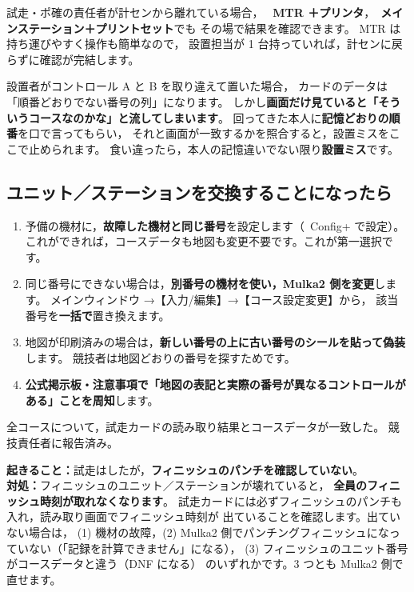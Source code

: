 \begin{Note}
試走・ポ確の責任者が計センから離れている場合，
\tEMIT\ \textbf{MTR ＋プリンタ}，\tSI\ \textbf{メインステーション＋プリントセット}でも
その場で結果を確認できます。
MTR は持ち運びやすく操作も簡単なので，
設置担当が 1 台持っていれば，計センに戻らずに確認が完結します。
\end{Note}

\begin{Note}
設置者がコントロール A と B を取り違えて置いた場合，
カードのデータは「順番どおりでない番号の列」になります。
しかし\textbf{画面だけ見ていると「そういうコースなのかな」と流してしまいます}。
回ってきた本人に\textbf{記憶どおりの順番}を口で言ってもらい，
それと画面が一致するかを照合すると，設置ミスをここで止められます。
食い違ったら，本人の記憶違いでない限り\textbf{設置ミス}です。
\end{Note}

\subsection*{ユニット／ステーションを交換することになったら}

\begin{enumerate}
\item 予備の機材に，\textbf{故障した機材と同じ番号}を設定します（\tSI\ Config+ で設定）。
      これができれば，コースデータも地図も変更不要です。これが第一選択です。
\item 同じ番号にできない場合は，\textbf{別番号の機材を使い，Mulka2 側を変更}します。
      メインウィンドウ →【入力/編集】→【コース設定変更】から，
      該当番号を\textbf{一括で}置き換えます。
\item 地図が印刷済みの場合は，\textbf{新しい番号の上に古い番号のシールを貼って偽装}します。
      競技者は地図どおりの番号を探すためです。
\item \textbf{公式掲示板・注意事項で「地図の表記と実際の番号が異なるコントロールがある」ことを周知}します。
\end{enumerate}

\begin{Done}
全コースについて，試走カードの読み取り結果とコースデータが一致した。
競技責任者に報告済み。
\end{Done}

\begin{Fail}
\textbf{起きること：}試走はしたが，\textbf{フィニッシュのパンチを確認していない}。\\
\textbf{対処：}フィニッシュのユニット／ステーションが壊れていると，
\textbf{全員のフィニッシュ時刻が取れなくなります}。
試走カードには必ずフィニッシュのパンチも入れ，読み取り画面でフィニッシュ時刻が
出ていることを確認します。出ていない場合は，
(1) 機材の故障，(2) Mulka2 側でパンチングフィニッシュになっていない（「記録を計算できません」になる），
(3) フィニッシュのユニット番号がコースデータと違う（DNF になる）
のいずれかです。3 つとも Mulka2 側で直せます。
\end{Fail}


